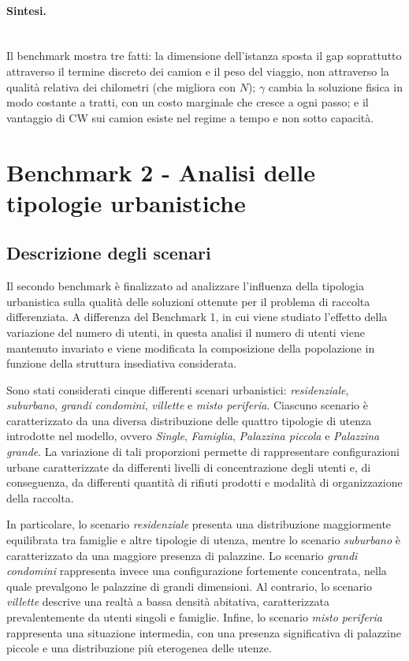 \paragraph{Sintesi.}\mbox{}\\
Il benchmark mostra tre fatti: la dimensione dell'istanza sposta il gap soprattutto attraverso il termine discreto dei camion e il peso del viaggio, non attraverso la qualità relativa dei chilometri (che migliora con $N$); $\gamma$ cambia la soluzione fisica in modo costante a tratti, con un costo marginale che cresce a ogni passo; e il vantaggio di CW sui camion esiste nel regime a tempo e non sotto capacità.



\section{Benchmark 2 - Analisi delle tipologie urbanistiche}\label{se:b2}



\subsection{Descrizione degli scenari}

Il secondo benchmark è finalizzato ad analizzare l'influenza della tipologia urbanistica sulla qualità delle soluzioni ottenute per il problema di raccolta differenziata. A differenza del Benchmark 1, in cui viene studiato l'effetto della variazione del numero di utenti, in questa analisi il numero di utenti viene mantenuto invariato e viene modificata la composizione della popolazione in funzione della struttura insediativa considerata.

Sono stati considerati cinque differenti scenari urbanistici: \textit{residenziale}, \textit{suburbano}, \textit{grandi condomini}, \textit{villette} e \textit{misto periferia}. Ciascuno scenario è caratterizzato da una diversa distribuzione delle quattro tipologie di utenza introdotte nel modello, ovvero \textit{Single}, \textit{Famiglia}, \textit{Palazzina piccola} e \textit{Palazzina grande}. La variazione di tali proporzioni permette di rappresentare configurazioni urbane caratterizzate da differenti livelli di concentrazione degli utenti e, di conseguenza, da differenti quantità di rifiuti prodotti e modalità di organizzazione della raccolta.

In particolare, lo scenario \textit{residenziale} presenta una distribuzione maggiormente equilibrata tra famiglie e altre tipologie di utenza, mentre lo scenario \textit{suburbano} è caratterizzato da una maggiore presenza di palazzine. Lo scenario \textit{grandi condomini} rappresenta invece una configurazione fortemente concentrata, nella quale prevalgono le palazzine di grandi dimensioni. Al contrario, lo scenario \textit{villette} descrive una realtà a bassa densità abitativa, caratterizzata prevalentemente da utenti singoli e famiglie. Infine, lo scenario \textit{misto periferia} rappresenta una situazione intermedia, con una presenza significativa di palazzine piccole e una distribuzione più eterogenea delle utenze.

